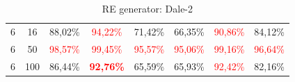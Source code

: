\begin{table}[ht]
\begin{tabular}{cc|c|c|c|c|c|c}
        {6} & {16}  & {88,02\%}                & \textcolor{red}{94,22\%}          & {71,42\%}                & {66,35\%}                & \textcolor{red}{90,86\%} & {84,12\%}                \\
        {6} & {50}  & \textcolor{red}{98,57\%} & \textcolor{red}{99,45\%}          & \textcolor{red}{95,57\%} & \textcolor{red}{95,06\%} & \textcolor{red}{99,16\%} & \textcolor{red}{96,64\%} \\
        {6} & {100} & {86,44\%}                & \textcolor{red}{\textbf{92,76\%}} & {65,59\%}                & {65,93\%}                & \textcolor{red}{92,42\%} & {82,16\%}                \\
        \bottomrule
    \end{tabular}
    \caption{RE generator: Dale-2}
    \label{tab:probing:re-generator:dale-2}
\end{table}

